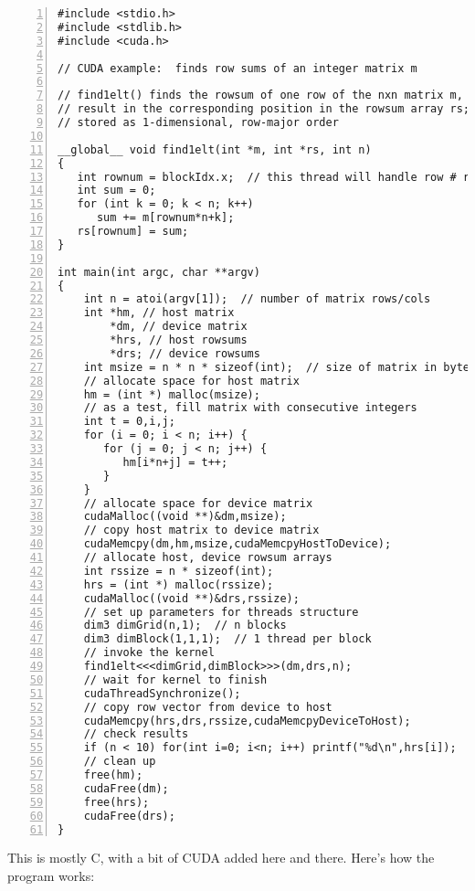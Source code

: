 \begin{lstlisting}[numbers=left]
#include <stdio.h>
#include <stdlib.h>
#include <cuda.h>

// CUDA example:  finds row sums of an integer matrix m

// find1elt() finds the rowsum of one row of the nxn matrix m, storing the
// result in the corresponding position in the rowsum array rs; matrix
// stored as 1-dimensional, row-major order

__global__ void find1elt(int *m, int *rs, int n)
{
   int rownum = blockIdx.x;  // this thread will handle row # rownum
   int sum = 0;
   for (int k = 0; k < n; k++)
      sum += m[rownum*n+k];
   rs[rownum] = sum;
}

int main(int argc, char **argv)
{
    int n = atoi(argv[1]);  // number of matrix rows/cols
    int *hm, // host matrix
        *dm, // device matrix
        *hrs, // host rowsums
        *drs; // device rowsums
    int msize = n * n * sizeof(int);  // size of matrix in bytes
    // allocate space for host matrix
    hm = (int *) malloc(msize);  
    // as a test, fill matrix with consecutive integers
    int t = 0,i,j;
    for (i = 0; i < n; i++) {
       for (j = 0; j < n; j++) {
          hm[i*n+j] = t++;
       }
    }
    // allocate space for device matrix 
    cudaMalloc((void **)&dm,msize);
    // copy host matrix to device matrix
    cudaMemcpy(dm,hm,msize,cudaMemcpyHostToDevice);
    // allocate host, device rowsum arrays
    int rssize = n * sizeof(int);
    hrs = (int *) malloc(rssize);  
    cudaMalloc((void **)&drs,rssize);
    // set up parameters for threads structure
    dim3 dimGrid(n,1);  // n blocks 
    dim3 dimBlock(1,1,1);  // 1 thread per block
    // invoke the kernel
    find1elt<<<dimGrid,dimBlock>>>(dm,drs,n);
    // wait for kernel to finish
    cudaThreadSynchronize();
    // copy row vector from device to host
    cudaMemcpy(hrs,drs,rssize,cudaMemcpyDeviceToHost);
    // check results
    if (n < 10) for(int i=0; i<n; i++) printf("%d\n",hrs[i]);
    // clean up
    free(hm);
    cudaFree(dm);
    free(hrs);
    cudaFree(drs);
}
\end{lstlisting}

This is mostly C, with a bit of CUDA added here and there.  Here's
how the program works:

